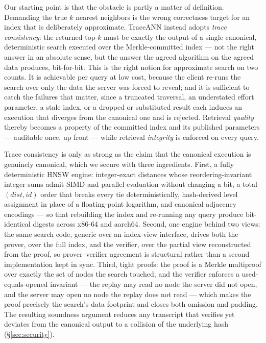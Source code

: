 \documentclass[11pt]{article}
\newcommand{\sys}{TraceANN}
\begin{document}
Our starting point is that the obstacle is partly a matter of
definition. Demanding the true $k$ nearest neighbors is the wrong
correctness target for an index that is deliberately approximate. \sys{}
instead adopts \emph{trace consistency}: the returned top-$k$ must be
exactly the output of a single canonical, deterministic search executed
over the Merkle-committed index --- not the right answer in an absolute
sense, but the answer the agreed algorithm on the agreed data produces,
bit-for-bit. This is the right notion for approximate search on two
counts. It is achievable per query at low cost, because the client
re-runs the search over only the data the server was forced to reveal;
and it is sufficient to catch the failures that matter, since a
truncated traversal, an understated effort parameter, a stale index, or
a dropped or substituted result each induces an execution that diverges
from the canonical one and is rejected. Retrieval \emph{quality} thereby
becomes a property of the committed index and its published parameters
--- auditable once, up front --- while retrieval \emph{integrity} is
enforced on every query.

Trace consistency is only as strong as the claim that the canonical
execution is genuinely canonical, which we secure with three
ingredients. First, a fully deterministic HNSW engine: integer-exact
distances whose reordering-invariant integer sums admit SIMD and
parallel evaluation without changing a bit, a total
$(\mathit{dist},\mathit{id})$ order that breaks every tie
deterministically, hash-derived level assignment in place of a
floating-point logarithm, and canonical adjacency encodings --- so that
rebuilding the index and re-running any query produce bit-identical
digests across x86-64 and aarch64. Second, one engine behind two views:
the same search code, generic over an index-view interface, drives both
the prover, over the full index, and the verifier, over the partial view
reconstructed from the proof, so prover--verifier agreement is
structural rather than a second implementation kept in sync. Third,
tight proofs: the proof is a Merkle multiproof over exactly the set of
nodes the search touched, and the verifier enforces a used-equals-opened
invariant --- the replay may read no node the server did not open, and
the server may open no node the replay does not read --- which makes the
proof precisely the search's data footprint and closes both omission and
padding. The resulting soundness argument reduces any transcript that
verifies yet deviates from the canonical output to a collision of the
underlying hash (\S\ref{sec:security}).
\end{document}
